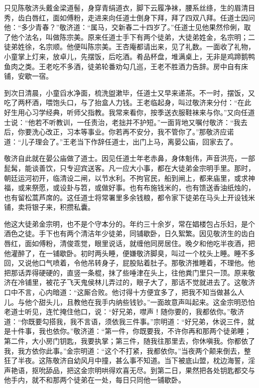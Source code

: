 只见陈敬济头戴金梁道髻，身穿青绢道衣，脚下云履净袜，腰系丝绦，生的眉清目秀，齿白唇红，面如傅粉，走进来向任道士倒身下拜，拜了四双八拜。任道士因问他：“多少青春？”敬济道：“属马，交新春二十四岁了。”任道士见他果然伶俐，取了他个法名，叫做陈宗美。原来任道士手下有两个徒弟，大徒弟姓金，名宗明；二徒弟姓徐，名宗顺。他便叫陈宗美。王杏庵都请出来，见了礼数。一面收了礼物，小童掌上灯来，放卓儿，先摆饭，后吃酒。肴品杯盘，堆满桌上，无非是鸡蹄鹅鸭鱼肉之类。王老吃不多酒，徒弟轮番劝勾几巡，王老不胜酒力告辞。房中自有床铺，安歇一宿。

到次日清晨，小童舀水净面，梳洗盥漱毕，任道士又早来递茶。不一时，摆饭，又吃了两杯酒，喂饱头口，与了抬盒人力钱。王老临起身，叫过敬济来分付：“在此好生用心习学经典，听师父指教。我常来看你，按季送衣服鞋袜来与你。”又向任道士说：“他若不听教训，一任责治，老拙并不护短。”一面背地又嘱付敬济：“我去后，你要洗心改正，习本等事业。你若再不安分，我不管你了。”那敬济应诺道：“儿子理会了。”王老当下作辞任道士，出门上马，离晏公庙，回家去了。

敬济自此就在晏公庙做了道士。因见任道士年老赤鼻，身体魁伟，声音洪亮，一部髭髯，能谈善饮，只专迎宾送客。凡一应大小事，都在大徒弟金宗明手里。那时，朝廷运河初开，临清设二闸，以节水利。不拘官民，船到闸上，都来庙里，或求神福，或来祭愿，或设卦与笤，或做好事。也有布施钱米的，也有馈送香油纸烛的，也有留松蒿芦席的。这任道士将常署里多余钱粮，都令家下徒弟在马头上开设钱米铺，卖将银子来，积攒私囊。

他这大徒弟金宗明，也不是个守本分的。年约三十余岁，常在娼楼包占乐妇，是个酒色之徒。手下也有两个清洁年少徒弟，同铺歇卧，日久絮繁。因见敬济生的齿白唇红，面如傅粉，清俊乖觉，眼里说话，就缠他同房居住。晚夕和他吃半夜酒，把他灌醉了，在一铺歇卧。初时两头睡，便嫌敬济脚臭，叫过一个枕头上睡。睡不多回，又说他口气喷着，令他吊转身子，屁股贴着肚子。那敬济推睡着，不理他。他把那话弄得硬硬的，直竖一条棍，抹了些唾津在头上，往他粪门里只一顶。原来敬济在冷铺里，被花子飞天鬼侯林儿弄过的，眼子大了，那话不觉就进去了。这敬济口中不言，心内暗道：“这厮合败。他讨得十方便宜多了，把我不知当做甚么人儿。与他个甜头儿，且教他在我手内纳些钱钞。”一面故意声叫起来。这金宗明恐怕老道士听见，连忙掩住他口，说：“好兄弟，噤声！随你要的，我都依你。”敬济道：“你既要勾搭我，我不言语，须依我三件事。”宗明道：“好兄弟，休说三件，就是十件事，我也依你。”敬济道：“第一件，你既要我，不许你再和那两个徒弟睡；第二件，大小房门钥匙，我要执掌；第三件，随我往那里去，你休嗔我。你都依了我，我方依你此事。”金宗明道：“这个不打紧，我都依你。”当夜两个颠来倒去，整狂了半夜。这陈敬济自幼风月中撞，甚么事不知道。当下被底山盟，枕边海誓，淫声艳语，抠吮舔品，把这金宗明哄得欢喜无尽。到第二日，果然把各处钥匙都交与他手内，就不和那两个徒弟在一处，每日只同他一铺歇卧。

